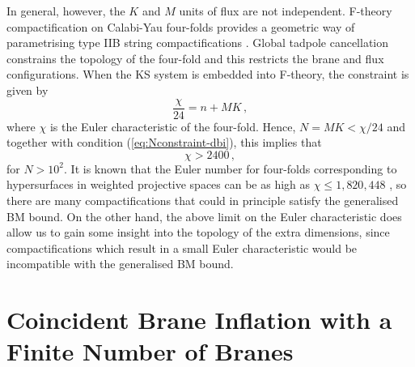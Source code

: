 In general, however, the $K$ and $M$ units of flux are not independent. 
F-theory compactification on Calabi-Yau four-folds
provides a geometric way of parametrising  
type IIB string compactifications
\cite{witten1,witten2,witten3,sethi,gkp,klemm}. 
Global tadpole cancellation constrains the topology of the four-fold
and this restricts the brane and flux configurations.  
When the KS system is embedded into F-theory, the  
constraint is given by \cite{gkp}
% 
\begin{equation}
\label{eq:Ftheory}
\frac{\chi}{24} = n + MK \,,
\end{equation}
% 
where $\chi$ is the Euler characteristic of the four-fold.  
Hence, $N = MK < \chi /24$ and together with condition 
(\ref{eq:Nconstraint-dbi}), this implies that
% 
\begin{equation}
\label{eq:chilimit}
\chi > 2400 \,,
\end{equation}
% 
for $N > 10^2$.
It is known that the Euler number for four-folds 
corresponding to hypersurfaces in weighted projective spaces
can be as high as $\chi \le 1,820,448$ \cite{klemm},
so there are many compactifications that could 
in principle satisfy the generalised BM bound.
On the other hand, the above limit on the Euler characteristic 
does allow us to gain some insight into the 
topology of the extra dimensions, since compactifications 
which result in a small Euler characteristic would be  
incompatible with the generalised BM bound. 

% 
% 
\section{Coincident Brane Inflation with a Finite Number of Branes}
\label{sec:finiten-multi}

